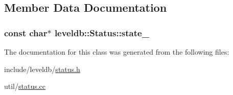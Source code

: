 \subsection{Member Data Documentation}
\hypertarget{classleveldb_1_1_status_a883e92e066654d6e6deaaa31aa0c5e51}{}
\subsubsection[{state\+\_\+}]{\setlength{\rightskip}{0pt plus 5cm}const char$\ast$ leveldb\+::\+Status\+::state\+\_\+\hspace{0.3cm}{\ttfamily [private]}}\label{classleveldb_1_1_status_a883e92e066654d6e6deaaa31aa0c5e51}


The documentation for this class was generated from the following files\+:\begin{DoxyCompactItemize}
\item 
include/leveldb/\hyperlink{status_8h}{status.\+h}\item 
util/\hyperlink{status_8cc}{status.\+cc}\end{DoxyCompactItemize}
